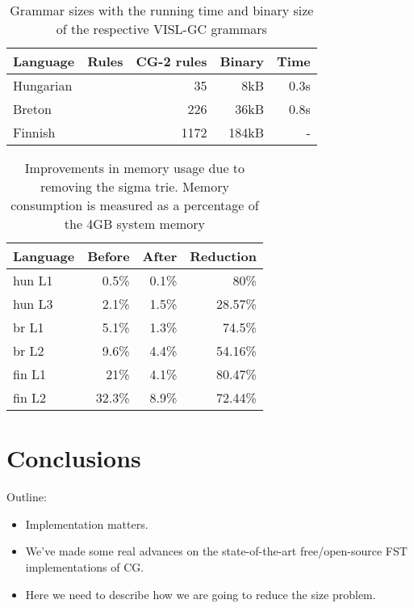 \documentclass{article}
\begin{document}
\begin{table*}[h]
  \centering
  \caption{Grammar sizes with the running time and binary size of the respective
           VISL-GC grammars}
  \label{tab:grammar_size}
  \begin{tabular}{ | l | r | r | r | r | }
  \hline
  \textbf{Language} & \textbf{Rules} & \textbf{CG-2 rules} &
  \textbf{Binary} & \textbf{Time} \\
  \hline
  Hungarian & &   35 &   8kB & 0.3s \\
  Breton    & &  226 &  36kB & 0.8s \\
  Finnish   & & 1172 & 184kB & - \\    %
  \hline
  \end{tabular}
\end{table*}

\begin{table}[h]
  \centering
  \caption{Improvements in memory usage due to removing the sigma trie. Memory
           consumption is measured as a percentage of the 4GB system memory}
  \label{tab:sigma_memory}
  \begin{tabular}{ | l | r | r | r | }
  \hline
  \textbf{Language} & \textbf{Before} & \textbf{After} & \textbf{Reduction} \\
  \hline
  hun L1 & 0.5\% & 0.1\% & 80\% \\
  hun L3 & 2.1\% & 1.5\% & 28.57\% \\
  br L1 & 5.1\% & 1.3\% & 74.5\% \\
  br L2 & 9.6\% & 4.4\% & 54.16\% \\
  fin L1 & 21\% & 4.1\% & 80.47\% \\
  fin L2 & 32.3\% & 8.9\% & 72.44\% \\
  \hline
  \end{tabular}
\end{table}

\section{Conclusions}
\label{sec:conclusion}
Outline:
\begin{itemize}
\item Implementation matters.
\item We've made some real advances on the state-of-the-art free/open-source
  FST implementations of CG. 
\item Here we need to describe how we are going to reduce the size problem.
\end{itemize}
\end{document}
